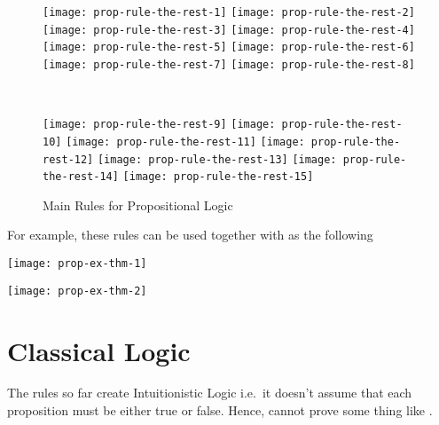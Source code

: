 \documentclass[master.tex]{subfiles}
\begin{document}
\begin{figure}[H]
    \centering

\begin{minipage}{0.48\textwidth}
\begin{flushleft}
\texttt{[image: prop-rule-the-rest-1]}
\texttt{[image: prop-rule-the-rest-2]}
\texttt{[image: prop-rule-the-rest-3]}
\texttt{[image: prop-rule-the-rest-4]}
\texttt{[image: prop-rule-the-rest-5]}
\texttt{[image: prop-rule-the-rest-6]}
\texttt{[image: prop-rule-the-rest-7]}
\texttt{[image: prop-rule-the-rest-8]}
\end{flushleft}
\end{minipage}
~
\begin{minipage}{0.48\textwidth}
\begin{flushright}
\texttt{[image: prop-rule-the-rest-9]}
\texttt{[image: prop-rule-the-rest-10]}
\texttt{[image: prop-rule-the-rest-11]}
\texttt{[image: prop-rule-the-rest-12]}
\texttt{[image: prop-rule-the-rest-13]}
\texttt{[image: prop-rule-the-rest-14]}
\texttt{[image: prop-rule-the-rest-15]}
\end{flushright}
\end{minipage}

    \caption{Main Rules for Propositional Logic}
\label{fig:prop-rule-main-rules}
\end{figure}

For example, these rules can be used together with  as the
following

\begin{center}
  \texttt{[image: prop-ex-thm-1]}
\end{center}
\begin{center}
  \texttt{[image: prop-ex-thm-2]}
\end{center}

\section{Classical Logic}

The rules so far create Intuitionistic Logic i.e.\ it doesn't assume that each
proposition must be either true or false. Hence, cannot prove some thing like
.
\end{document}
